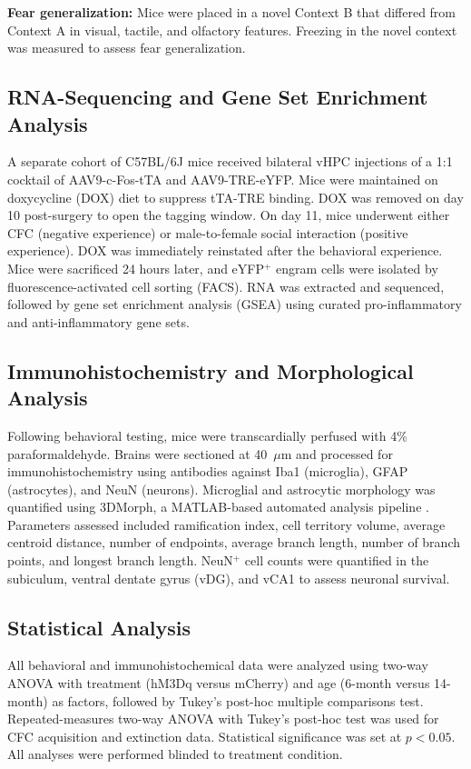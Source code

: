 \documentclass[11pt]{article}
\begin{document}
\textbf{Fear generalization:} Mice were placed in a novel Context B that differed from Context A in visual, tactile, and olfactory features. Freezing in the novel context was measured to assess fear generalization.

\subsection{RNA-Sequencing and Gene Set Enrichment Analysis}

A separate cohort of C57BL/6J mice received bilateral vHPC injections of a 1:1 cocktail of AAV9-c-Fos-tTA and AAV9-TRE-eYFP. Mice were maintained on doxycycline (DOX) diet to suppress tTA-TRE binding. DOX was removed on day 10 post-surgery to open the tagging window. On day 11, mice underwent either CFC (negative experience) or male-to-female social interaction (positive experience). DOX was immediately reinstated after the behavioral experience. Mice were sacrificed 24 hours later, and eYFP$^+$ engram cells were isolated by fluorescence-activated cell sorting (FACS). RNA was extracted and sequenced, followed by gene set enrichment analysis (GSEA) using curated pro-inflammatory and anti-inflammatory gene sets.

\subsection{Immunohistochemistry and Morphological Analysis}

Following behavioral testing, mice were transcardially perfused with 4\% paraformaldehyde. Brains were sectioned at 40~$\mu$m and processed for immunohistochemistry using antibodies against Iba1 (microglia), GFAP (astrocytes), and NeuN (neurons). Microglial and astrocytic morphology was quantified using 3DMorph, a MATLAB-based automated analysis pipeline \citep{york2018microglia}. Parameters assessed included ramification index, cell territory volume, average centroid distance, number of endpoints, average branch length, number of branch points, and longest branch length. NeuN$^+$ cell counts were quantified in the subiculum, ventral dentate gyrus (vDG), and vCA1 to assess neuronal survival.

\subsection{Statistical Analysis}

All behavioral and immunohistochemical data were analyzed using two-way ANOVA with treatment (hM3Dq versus mCherry) and age (6-month versus 14-month) as factors, followed by Tukey's post-hoc multiple comparisons test. Repeated-measures two-way ANOVA with Tukey's post-hoc test was used for CFC acquisition and extinction data. Statistical significance was set at $p < 0.05$. All analyses were performed blinded to treatment condition.
\end{document}
